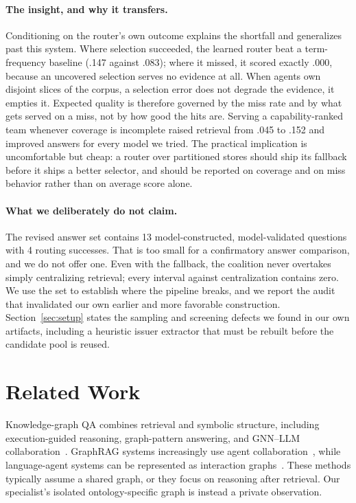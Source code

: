 \documentclass{article}
\begin{document}
\paragraph{The insight, and why it transfers.} Conditioning on the router's own
outcome explains the shortfall and generalizes past this system. Where selection
succeeded, the learned router beat a term-frequency baseline (.147 against
.083); where it missed, it scored exactly .000, because an uncovered selection
serves no evidence at all. When agents own disjoint slices of the corpus, a
selection error does not degrade the evidence, it empties it. Expected quality is
therefore governed by the miss rate and by what gets served on a miss, not by how
good the hits are. Serving a capability-ranked team whenever coverage is
incomplete raised retrieval from .045 to .152 and improved answers for every
model we tried. The practical implication is uncomfortable but cheap: a router
over partitioned stores should ship its fallback before it ships a better
selector, and should be reported on coverage and on miss behavior rather than on
average score alone.

\paragraph{What we deliberately do not claim.} The revised answer set contains 13
model-constructed, model-validated questions with 4 routing successes. That is
too small for a confirmatory answer comparison, and we do not offer one. Even
with the fallback, the coalition never overtakes simply centralizing retrieval;
every interval against centralization contains zero. We use the set to establish
where the pipeline breaks, and we report the audit that invalidated our own
earlier and more favorable construction. Section~\ref{sec:setup} states the
sampling and screening defects we found in our own artifacts, including a
heuristic issuer extractor that must be rebuilt before the candidate pool is
reused.

\section{Related Work}
Knowledge-graph QA combines retrieval and symbolic structure, including execution-guided reasoning, graph-pattern answering, and GNN--LLM collaboration~\citep{ren2021lego,cucumides2025unravl,liu2025dual}. GraphRAG systems increasingly use agent collaboration~\citep{capozzi2026agentic,xu2025openworld}, while language-agent systems can be represented as interaction graphs~\citep{zhuge2024gptswarm}. These methods typically assume a shared graph, or they focus on reasoning after retrieval. Our specialist's isolated ontology-specific graph is instead a private observation.
\end{document}
